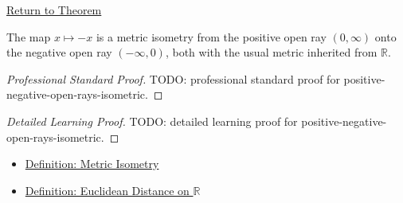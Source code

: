 \newpage
{}
\label{prf:positive-negative-open-rays-isometric}

\begin{remark*}[Return]
\hyperref[thm:positive-negative-open-rays-isometric]{Return to Theorem}
\end{remark*}

\begin{theorem*}
The map \(x\mapsto -x\) is a metric isometry from the positive open ray
\((0,\infty)\) onto the negative open ray \((-\infty,0)\), both with the
usual metric inherited from \(\mathbb{R}\).
\end{theorem*}

\begin{proof}[Professional Standard Proof]
\LRAProofBodyStart
TODO: professional standard proof for positive-negative-open-rays-isometric.
\end{proof}

\begin{proof}[Detailed Learning Proof]
\LRAProofBodyStart
TODO: detailed learning proof for positive-negative-open-rays-isometric.
\end{proof}

\begin{remark*}
\end{remark*}

\begin{dependencies}
\begin{itemize}
  \item \hyperref[def:metric-isometry]{Definition: Metric Isometry}
  \item \hyperref[def:real-line-euclidean-distance]{Definition: Euclidean Distance on \(\mathbb{R}\)}
\end{itemize}
\end{dependencies}

\clearpage
